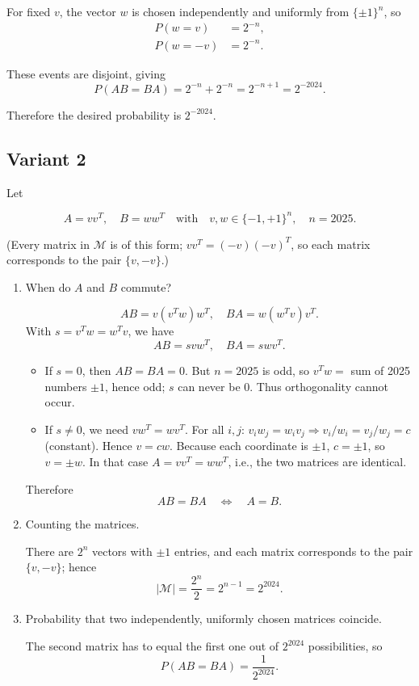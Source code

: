 \documentclass[12pt,a4paper]{article}
\theoremstyle{definition}
\begin{document}
        For fixed $v$, the vector $w$ is chosen independently and uniformly from $\{\pm 1\}^n$, so
        \begin{align}
            P(w = v) &= 2^{-n}, \\
            P(w = -v) &= 2^{-n}.
        \end{align}

        These events are disjoint, giving
        \[
            P(AB = BA) = 2^{-n} + 2^{-n} = 2^{-n+1} = 2^{-2024}.
        \]

        Therefore the desired probability is $\boxed{2^{-2024}}$.

    \subsection{Variant 2}
    Let

    $$A = vv^T, \quad B = ww^T \quad \text{with} \quad v, w \in \{-1, +1\}^n, \quad n = 2025.$$

    (Every matrix in $\mathcal{M}$ is of this form; $vv^T = (-v)(-v)^T$, so each matrix corresponds to the pair $\{v, -v\}$.)

    \begin{enumerate}
        \item When do $A$ and $B$ commute?

        $$AB = v(v^T w)w^T, \quad BA = w(w^T v)v^T.$$
        With $s = v^T w = w^T v$, we have
        $$AB = svw^T, \quad BA = swv^T.$$

        \begin{itemize}
            \item If $s = 0$, then $AB = BA = 0$.
            But $n = 2025$ is odd, so $v^T w = $ sum of 2025 numbers $\pm 1$, hence odd; $s$ can never be 0.
            Thus orthogonality cannot occur.

            \item If $s \neq 0$, we need $vw^T = wv^T$.
            For all $i, j$: $v_i w_j = w_i v_j \Rightarrow v_i / w_i = v_j / w_j = c$ (constant).
            Hence $v = cw$. Because each coordinate is $\pm 1$, $c = \pm 1$, so $v = \pm w$.
            In that case $A = vv^T = ww^T$, i.e., the two matrices are identical.
        \end{itemize}

        Therefore
        $$AB = BA \quad \Leftrightarrow \quad A = B.$$

        \item Counting the matrices.

        There are $2^n$ vectors with $\pm 1$ entries, and each matrix corresponds to the pair $\{v, -v\}$; hence
        $$|\mathcal{M}| = \frac{2^n}{2} = 2^{n-1} = 2^{2024}.$$

        \item Probability that two independently, uniformly chosen matrices coincide.

        The second matrix has to equal the first one out of $2^{2024}$ possibilities, so
        $$P(AB = BA) = \frac{1}{2^{2024}}.$$
    \end{enumerate}
\end{document}
